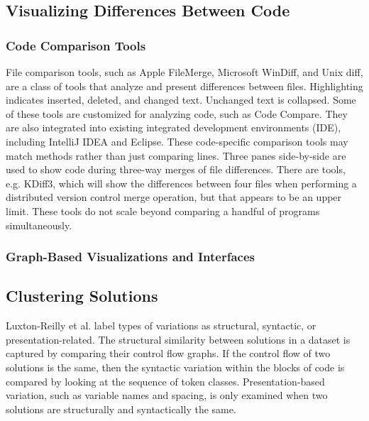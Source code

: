 

\subsection{Visualizing Differences Between Code}

\subsubsection{Code Comparison Tools}
File comparison tools, such as Apple FileMerge, Microsoft WinDiff, and Unix diff, are a class of tools that analyze and present differences between files. Highlighting indicates inserted, deleted, and changed text. Unchanged text is collapsed. Some of these tools are customized for analyzing code, such as Code Compare. They are also integrated into existing integrated development environments (IDE), including IntelliJ IDEA and Eclipse. These code-specific comparison tools may match methods rather than just comparing lines. Three panes side-by-side are used to show code during three-way merges of file differences. There are tools, e.g. KDiff3, which will show the differences between four files when performing a distributed version control merge operation, but that appears to be an upper limit. These tools do not scale beyond comparing a handful of programs simultaneously.

\subsubsection{Graph-Based Visualizations and Interfaces}

\subsection{Clustering Solutions}

Luxton-Reilly et al. \citeyear{Luxton13} label types of variations as structural, syntactic, or presentation-related. The structural similarity between solutions in a dataset is captured by comparing their control flow graphs. If the control flow of two solutions is the same, then the syntactic variation within the blocks of code is compared by looking at the sequence of token classes. Presentation-based variation, such as variable names and spacing, is only examined when two solutions are structurally and syntactically the same. %

